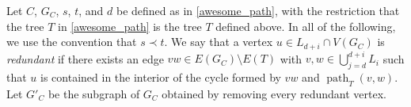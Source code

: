 \documentclass{patmorin}
\newcommand{\defin}[1]{\emph{\textcolor{brightmaroon}{#1}}}
\DeclareMathOperator{\pth}{path}
\begin{document}
%
%
%
%
%


Let $C$, $G_C$, $s$, $t$, and $d$ be defined as in \cref{awesome_path}, with the restriction that the tree $T$ in \cref{awesome_path} is the tree $T$ defined above.  In all of the following, we use the convention that $s\prec t$.  We say that a vertex $u\in L_{d+i}\cap V(G_C)$ is \defin{redundant} if there exists an edge $vw\in E(G_C)\setminus E(T)$ with $v,w\in\bigcup_{j=d}^{d+i} L_i$ such that $u$ is contained in the interior of the cycle formed by $vw$ and $\pth_T(v,w)$.  Let $G'_C$ be the subgraph of $G_C$ obtained by removing every redundant vertex.
\end{document}

